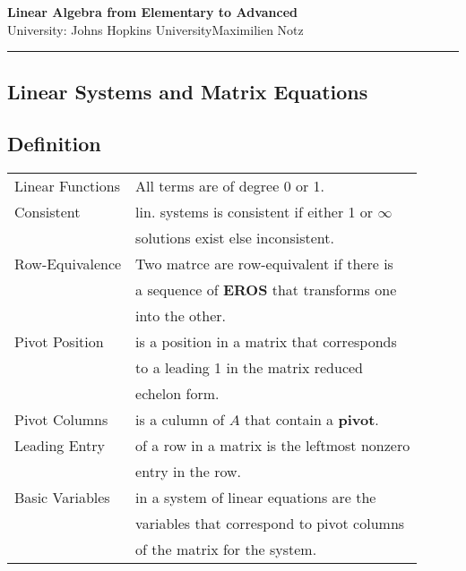 \documentclass[5pt]{article}
\begin{document}
\begin{center}
     \Large{\textbf{Linear Algebra from Elementary to Advanced}}\\
     \footnotesize{University: Johns Hopkins University}\hfill\footnotesize{\textcopyleft Maximilien Notz \the\year{}}
     \noindent\rule{20.2cm}{0.4pt}
\end{center}


\begin{multicols}{2}
\setcounter{secnumdepth}{0}

\section{Linear Systems and Matrix Equations}
\subsection{Definition}
\begin{tabular}{ll}
    Linear Functions        & All terms are of  degree 0 or 1. \\
    Consistent              & lin. systems is consistent if either 1 or $\infty$ \\
                            & solutions exist else inconsistent.\\
\small{Row-Equivalence}     & Two matrce are row-equivalent if there is\\
                            & a sequence of \textbf{EROS} that transforms one\\
                            & into the other.\\
    Pivot Position          & is a position in a matrix that corresponds\\
                            & to a leading 1 in the matrix reduced\\
                            & echelon form.\\
    Pivot Columns           & is a culumn of $A$ that contain a \textbf{pivot}.\\
    Leading Entry           & of a row in a matrix is the leftmost nonzero\\
                            & entry in the row.\\
    Basic Variables         & in a system of linear equations are the\\
                            & variables that correspond to pivot columns\\
                            & of the matrix for the system.\\                    

\end{tabular}
\end{multicols}
\end{document}
